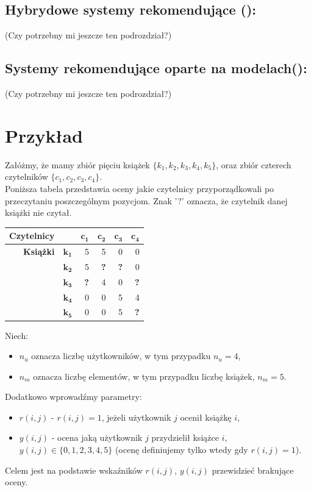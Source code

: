 \documentclass[12pt,a4paper]{report}
\begin{document}
{\section{Hybrydowe systemy rekomendujące ():}
(Czy potrzebny mi jeszcze ten podrozdział?)

\section{Systemy rekomendujące oparte na modelach():}
(Czy potrzebny mi jeszcze ten podrozdział?)
\chapter{Przykład}
Załóżmy, że mamy zbiór pięciu książek $\{k_1, k_2, k_3, k_4, k_5\}$, oraz zbiór czterech czytelników $\{c_1, c_2, c_3, c_4\}$.
\\Poniższa tabela przedstawia oceny jakie czytelnicy przyporządkowali po przeczytaniu poszczególnym pozycjom. Znak '?' oznacza, że czytelnik danej książki nie czytał.

\begin{center}
\begin{tabular}{|r|r|r|r|r|r|} \hline
\textbf{Czytelnicy} & & $\mathbf{c_1}$ & $\mathbf{c_2}$ & $\mathbf{c_3}$ & $\mathbf{c_4}$ \\
\hline
\hline
\textbf{Książki} &$\mathbf{k_1}$ & 5 & 5 & 0 & 0 \\
\hline
&$\mathbf{k_2}$ & 5 & \textbf{?} & \textbf{?} & 0 \\
\hline
&$\mathbf{k_3}$ & \textbf{?} & 4 & 0 & \textbf{?} \\
\hline
&$\mathbf{k_4}$ & 0 & 0 & 5 & 4 \\
\hline
&$\mathbf{k_5}$ & 0 & 0 & 5 & \textbf{?} \\
\hline
\end{tabular}
\end{center}
Niech:
\begin{itemize}
\item $n_u$ oznacza liczbę użytkowników, w tym przypadku $n_u = 4$,
\item $n_m$ oznacza liczbę elementów, w tym przypadku liczbę książek, $n_m = 5$.
\end{itemize}
Dodatkowo wprowadźmy parametry:
\begin{itemize}
\item $r(i,j)$ - $r(i,j)=1$, jeżeli użytkownik $j$ ocenił książkę $i$,
\item $y(i,j)$ - ocena jaką użytkownik $j$ przydzielił książce $i$, $y(i,j) \in \{0,1,2,3,4,5\}$ (ocenę definiujemy tylko wtedy gdy $r(i,j)=1$).
\end{itemize}
Celem jest na podstawie wskaźników $r(i,j)$, $y(i,j)$ przewidzieć brakujące oceny.
\\
}
\end{document}
